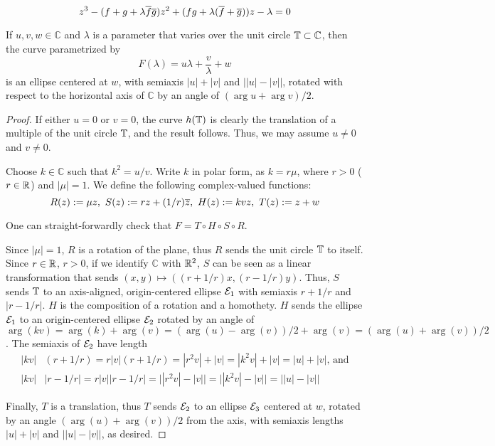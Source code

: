 \[
z^3-(f+g+\lambda\overline{f} \overline{g})z^2+(f g+\lambda(\overline f+\overline g))z-\lambda=0
\]

\begin{lemma}
If $u,v,w\in\mathbb{C}$ and $\lambda$ is a parameter that varies over the unit circle $\mathbb{T}\subset\mathbb{C}$, then the curve parametrized by
\[ F(\lambda)=u \lambda+ \frac{v}{\lambda}+w \]
is an ellipse centered at $w$, with semiaxis $|u|+|v|$ and $\big||u|-|v|\big|$, rotated with respect to the horizontal axis of $\mathbb{C}$ by an angle of $(\arg u+\arg v)/2$.
\label{lem:ell-param}
\end{lemma}

\begin{proof}
If either $u=0$ or $v=0$, the curve $h(\mathbb{T})$ is clearly the translation of a multiple of the unit circle $\mathbb{T}$, and the result follows. Thus, we may assume $u\neq 0$ and $v\neq 0$.

Choose $k\in\mathbb{C}$ such that $k^2=u/v$. Write $k$ in polar form, as $k=r \mu$, where $r>0$ ($r\in\mathbb{R}$) and $|\mu|=1$. We define the following complex-valued functions:
\[R(z):=\mu z,~ S(z):=r z+(1/r) \overline{z},~ H(z):=k v z,~ T(z):=z+w\]

One can straight-forwardly check that $F=T\circ H\circ S\circ R$.

Since $|\mu|=1$, $R$ is a rotation of the plane, thus $R$ sends the unit circle $\mathbb{T}$ to itself. Since $r\in\mathbb{R}$, $r>0$, if we identify $\mathbb{C}$ with $\mathbb{R}^2$, $S$ can be seen as a linear transformation that sends $(x,y)\mapsto\left(\left(r+1/r\right)x,\left(r-1/r\right)y\right)$. Thus, $S$ sends $\mathbb{T}$ to an axis-aligned, origin-centered ellipse $\mathcal{E}_1$ with semiaxis $r+1/r$ and $|r-1/r|$. $H$ is the composition of a rotation and a homothety. $H$ sends the ellipse $\mathcal{E}_1$ to an origin-centered ellipse $\mathcal{E}_2$ rotated by an angle of $\arg(k v)=\arg(k)+\arg(v)=(\arg(u)-\arg(v))/2+\arg(v)=(\arg(u)+\arg(v))/2$. The semiaxis of $\mathcal{E}_2$ have length
\begin{align*}
|k v|&(r+1/r)=r|v|(r+1/r)=|r^2 v|+|v|=|k^2 v|+|v|=|u|+|v|\text{, and}\\
|k v|&|r-1/r|=r|v||r-1/r|=\big||r^2 v|-|v|\big|=\big||k^2 v|-|v|\big|=\big||u|-|v|\big|
\end{align*}

Finally, $T$ is a translation, thus $T$ sends $\mathcal{E}_2$ to an ellipse $\mathcal{E}_3$ centered at $w$, rotated by an angle $(\arg(u)+\arg(v))/2$ from the axis, with semiaxis lengths $|u|+|v|$ and $\big||u|-|v|\big|$, as desired.
\end{proof}

